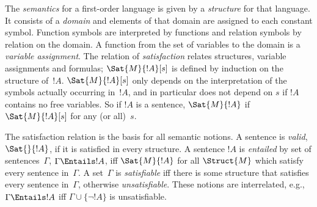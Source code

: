 The \emph{semantics} for a first-order language is given by a
\emph{structure} for that language. It consists of a \emph{domain} and
elements of that domain are assigned to each constant symbol. Function
symbols are interpreted by functions and relation symbols by relation
on the domain. A function from the set of variables to the domain is
a \emph{variable assignment}. The relation of \emph{satisfaction}
relates structures, variable assignments and formulas;
$\Sat{M}{!A}[s]$ is defined by induction on the structure of~$!A$.
$\Sat{M}{!A}[s]$ only depends on the interpretation of the symbols
actually occurring in~$!A$, and in particular does not depend on $s$
if $!A$ contains no free variables. So if $!A$ is a sentence,
$\Sat{M}{!A}$ if $\Sat{M}{!A}[s]$ for any (or all)~$s$.

The satisfaction relation is the basis for all semantic notions. A
sentence is \emph{valid}, $\Sat{{}}{!A}$, if it is satisfied in every
structure. A sentence $!A$ is \emph{entailed} by set of
sentences~$\Gamma$, $\Gamma \Entails !A$, iff $\Sat{M}{!A}$ for all
$\Struct{M}$ which satisfy every sentence in~$\Gamma$. A set~$\Gamma$
is \emph{satisfiable} iff there is some structure that satisfies every
sentence in~$\Gamma$, otherwise \emph{unsatisfiable}. These notions are
interrelated, e.g., $\Gamma \Entails !A$ iff $\Gamma \cup \{\lnot
!A\}$ is unsatisfiable.
